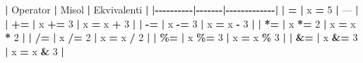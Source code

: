 \documentclass[a4paper,11pt,twoside,openright]{book}
\newenvironment{Shaded}{\begin{snugshade}}{\end{snugshade}}
\newcommand{\DecValTok}[1]{\textcolor[rgb]{0.00,0.00,0.81}{#1}}
\newcommand{\ErrorTok}[1]{\textcolor[rgb]{0.64,0.00,0.00}{\textbf{#1}}}
\newcommand{\NormalTok}[1]{#1}
\newcommand{\OperatorTok}[1]{\textcolor[rgb]{0.81,0.36,0.00}{\textbf{#1}}}
\begin{document}
\begin{Shaded}
\begin{Highlighting}[]
\OperatorTok{|}\NormalTok{ Operator }\OperatorTok{|}\NormalTok{ Misol }\OperatorTok{|}\NormalTok{ Ekvivalenti }\OperatorTok{|}
\OperatorTok{|{-}{-}{-}{-}{-}{-}{-}{-}{-}{-}|{-}{-}{-}{-}{-}{-}{-}|{-}{-}{-}{-}{-}{-}{-}{-}{-}{-}{-}{-}{-}|}
\OperatorTok{|} \ErrorTok{\textasciigrave{}}\OperatorTok{=}\ErrorTok{\textasciigrave{}} \OperatorTok{|} \ErrorTok{\textasciigrave{}}\NormalTok{x }\OperatorTok{=} \DecValTok{5}\ErrorTok{\textasciigrave{}} \OperatorTok{|}\NormalTok{ — }\OperatorTok{|}
\OperatorTok{|} \ErrorTok{\textasciigrave{}}\OperatorTok{+=}\ErrorTok{\textasciigrave{}} \OperatorTok{|} \ErrorTok{\textasciigrave{}}\NormalTok{x }\OperatorTok{+=} \DecValTok{3}\ErrorTok{\textasciigrave{}} \OperatorTok{|} \ErrorTok{\textasciigrave{}}\NormalTok{x }\OperatorTok{=}\NormalTok{ x }\OperatorTok{+} \DecValTok{3}\ErrorTok{\textasciigrave{}} \OperatorTok{|}
\OperatorTok{|} \ErrorTok{\textasciigrave{}}\OperatorTok{{-}=}\ErrorTok{\textasciigrave{}} \OperatorTok{|} \ErrorTok{\textasciigrave{}}\NormalTok{x }\OperatorTok{{-}=} \DecValTok{3}\ErrorTok{\textasciigrave{}} \OperatorTok{|} \ErrorTok{\textasciigrave{}}\NormalTok{x }\OperatorTok{=}\NormalTok{ x }\OperatorTok{{-}} \DecValTok{3}\ErrorTok{\textasciigrave{}} \OperatorTok{|}
\OperatorTok{|} \ErrorTok{\textasciigrave{}}\OperatorTok{*=}\ErrorTok{\textasciigrave{}} \OperatorTok{|} \ErrorTok{\textasciigrave{}}\NormalTok{x }\OperatorTok{*=} \DecValTok{2}\ErrorTok{\textasciigrave{}} \OperatorTok{|} \ErrorTok{\textasciigrave{}}\NormalTok{x }\OperatorTok{=}\NormalTok{ x }\OperatorTok{*} \DecValTok{2}\ErrorTok{\textasciigrave{}} \OperatorTok{|}
\OperatorTok{|} \ErrorTok{\textasciigrave{}}\OperatorTok{/=}\ErrorTok{\textasciigrave{}} \OperatorTok{|} \ErrorTok{\textasciigrave{}}\NormalTok{x }\OperatorTok{/=} \DecValTok{2}\ErrorTok{\textasciigrave{}} \OperatorTok{|} \ErrorTok{\textasciigrave{}}\NormalTok{x }\OperatorTok{=}\NormalTok{ x }\OperatorTok{/} \DecValTok{2}\ErrorTok{\textasciigrave{}} \OperatorTok{|}
\OperatorTok{|} \ErrorTok{\textasciigrave{}}\OperatorTok{\%=}\ErrorTok{\textasciigrave{}} \OperatorTok{|} \ErrorTok{\textasciigrave{}}\NormalTok{x }\OperatorTok{\%=} \DecValTok{3}\ErrorTok{\textasciigrave{}} \OperatorTok{|} \ErrorTok{\textasciigrave{}}\NormalTok{x }\OperatorTok{=}\NormalTok{ x }\OperatorTok{\%} \DecValTok{3}\ErrorTok{\textasciigrave{}} \OperatorTok{|}
\OperatorTok{|} \ErrorTok{\textasciigrave{}}\OperatorTok{\&=}\ErrorTok{\textasciigrave{}} \OperatorTok{|} \ErrorTok{\textasciigrave{}}\NormalTok{x }\OperatorTok{\&=} \DecValTok{3}\ErrorTok{\textasciigrave{}} \OperatorTok{|} \ErrorTok{\textasciigrave{}}\NormalTok{x }\OperatorTok{=}\NormalTok{ x }\OperatorTok{\&} \DecValTok{3}\ErrorTok{\textasciigrave{}} \OperatorTok{|}

\end{Highlighting}
\end{Shaded}
\end{document}
